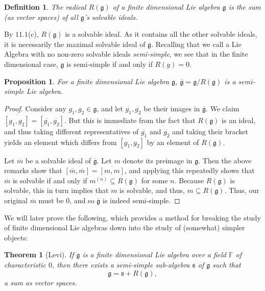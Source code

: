 \documentclass{amsart}
\newtheorem*{Theorem}{Theorem}
\newtheorem*{Def}{Definition}
\newtheorem*{Prop}{Proposition}
\newcommand*{\g}{\mathfrak{g}}
\begin{document}
\begin{Def}
The radical $R(\g)$ of a finite dimensional Lie algebra $\g$ is the sum (as vector spaces) of all $\g$'s solvable ideals.
\end{Def}

By $11.1$(c), $R(\g)$ is 
a solvable ideal.  As it contains all the other solvable ideals, it is necessarily the maximal solvable
ideal of $\g$.  Recalling that we call a Lie Algebra with no non-zero solvable ideals \textit{semi-simple}, we see that in
the finite dimensional case, $\g$ is semi-simple if and only if $R(g) = 0$.

\begin{Prop} For a finite dimensional Lie algebra $\g$, $\overline{\g}
  = \g / R(\g)$ is a semi-simple Lie algebra.  
\end{Prop}

\begin{proof}  Consider any $g_{1}, g_{2} \in \g$, and let
  $\overline{g_{1}}, \overline{g_{2}}$ be their images in
  $\overline{\g}$.  We claim $\overline{[g_{1},g_{2}]} =
  [\overline{g_{1}}, \overline{g_{2}}]$.  But this is immediate from
  the fact that $R(\g)$ is an ideal, and thus taking different
  representatives of $\overline{g_{1}}$ and $\overline{g_{2}}$ and
  taking their bracket yields an element which differs from
  $[g_{1},g_{2}]$ by an element of $R(\g)$.

 Let $\overline{m}$ be a solvable ideal of
  $\overline{\g}$. Let $m$ denote its preimage in $\g$.  Then the
  above remarks show that $[\overline{m}, \overline{m}] =
  \overline{[m,m]}$, and applying this repeatedly shows that
  $\overline{m}$ is solvable if and only if $m^{(n)} \subseteq R(\g)$
  for some $n$.  Because $R(\g)$ is solvable, this in turn implies
  that $m$ is solvable, and thus, $m \subseteq R(\g)$.  Thus, our
  original $\overline{m}$ must be $0$, and so $\overline{\g}$ is
  indeed semi-simple.
\end{proof}

We will later prove the following, which provides a method for
breaking the study of finite dimensional Lie algebras down into the
study of (somewhat) simpler objects:

\begin{Theorem}[Levi]  If $\g$ is a finite dimensional Lie algebra
  over a field $\mathbb{F}$ of characteristic $0$, then there exists a
  semi-simple sub-algebra $\mathfrak{s}$ of $\g$ such that $$\g =
  \mathfrak{s} + R(\g),$$ a sum as vector spaces.  
\end{Theorem}
\end{document}
